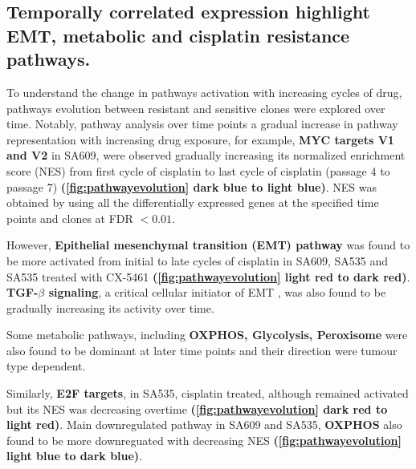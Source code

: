 

\subsection{Temporally correlated expression highlight EMT, metabolic and cisplatin resistance pathways.}
 To understand the change in pathways activation with increasing cycles of drug, pathways evolution between resistant and sensitive clones were explored over time. Notably, pathway analysis over time points a gradual increase in pathway representation with increasing drug exposure, for example, \textbf{MYC targets V1 and V2} in SA609, were observed gradually increasing its normalized enrichment score (NES) from first cycle of cisplatin to last cycle of cisplatin (passage 4 to passage 7) \textbf{(\autoref{fig:pathwayevolution} dark blue to light blue)}. NES was obtained by using all the differentially expressed genes at the specified time points and clones at FDR $< 0.01$. 
 
 However, \textbf{Epithelial mesenchymal transition (EMT) pathway} was found to be more activated from initial to late cycles of cisplatin in SA609, SA535 and SA535 treated with CX-5461 \textbf{(\autoref{fig:pathwayevolution} light red to dark red)}. \textbf{TGF-$\beta$ signaling}, a critical cellular initiator of EMT \cite{wellner2009emt}, was also found to be gradually increasing its activity over time. 

Some metabolic pathways, including \textbf{OXPHOS, Glycolysis, Peroxisome} were also found to be dominant at later time points and their direction were tumour type dependent.
 
 Similarly, \textbf{E2F targets}, in SA535, cisplatin treated, although remained activated but its NES was decreasing overtime \textbf{(\autoref{fig:pathwayevolution} dark red to light red)}. Main downregulated pathway in SA609 and SA535, \textbf{OXPHOS} also found to be more downreguated with decreasing NES \textbf{(\autoref{fig:pathwayevolution} light blue to dark blue)}.
 
